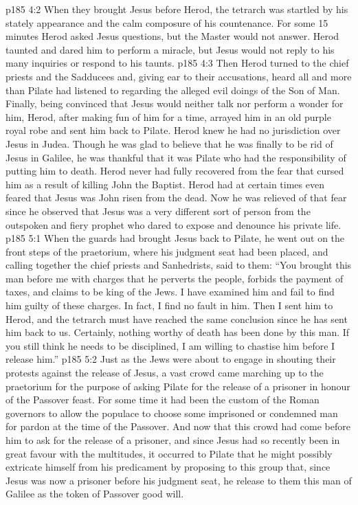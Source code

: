 \vs p185 4:2 When they brought Jesus before Herod, the tetrarch was startled by his stately appearance and the calm composure of his countenance. For some 15 minutes Herod asked Jesus questions, but the Master would not answer. Herod taunted and dared him to perform a miracle, but Jesus would not reply to his many inquiries or respond to his taunts.
\vs p185 4:3 Then Herod turned to the chief priests and the Sadducees and, giving ear to their accusations, heard all and more than Pilate had listened to regarding the alleged evil doings of the Son of Man. Finally, being convinced that Jesus would neither talk nor perform a wonder for him, Herod, after making fun of him for a time, arrayed him in an old purple royal robe and sent him back to Pilate. Herod knew he had no jurisdiction over Jesus in Judea. Though he was glad to believe that he was finally to be rid of Jesus in Galilee, he was thankful that it was Pilate who had the responsibility of putting him to death. Herod never had fully recovered from the fear that cursed him as a result of killing John the Baptist. Herod had at certain times even feared that Jesus was John risen from the dead. Now he was relieved of that fear since he observed that Jesus was a very different sort of person from the outspoken and fiery prophet who dared to expose and denounce his private life.
\vs p185 5:1 When the guards had brought Jesus back to Pilate, he went out on the front steps of the praetorium, where his judgment seat had been placed, and calling together the chief priests and Sanhedrists, said to them: “You brought this man before me with charges that he perverts the people, forbids the payment of taxes, and claims to be king of the Jews. I have examined him and fail to find him guilty of these charges. In fact, I find no fault in him. Then I sent him to Herod, and the tetrarch must have reached the same conclusion since he has sent him back to us. Certainly, nothing worthy of death has been done by this man. If you still think he needs to be disciplined, I am willing to chastise him before I release him.”
\vs p185 5:2 Just as the Jews were about to engage in shouting their protests against the release of Jesus, a vast crowd came marching up to the praetorium for the purpose of asking Pilate for the release of a prisoner in honour of the Passover feast. For some time it had been the custom of the Roman governors to allow the populace to choose some imprisoned or condemned man for pardon at the time of the Passover. And now that this crowd had come before him to ask for the release of a prisoner, and since Jesus had so recently been in great favour with the multitudes, it occurred to Pilate that he might possibly extricate himself from his predicament by proposing to this group that, since Jesus was now a prisoner before his judgment seat, he release to them this man of Galilee as the token of Passover good will.
